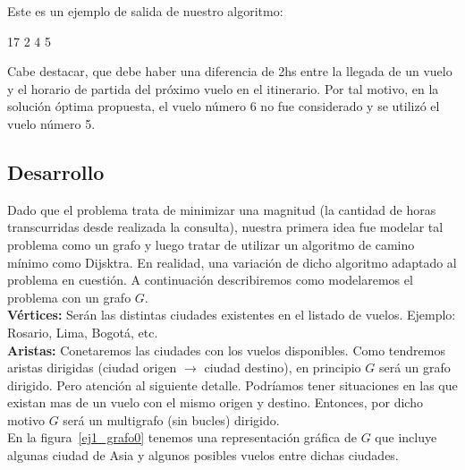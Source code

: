 Este es un ejemplo de salida de nuestro algoritmo:
\begin{codebox}
17 2 4 5
\end{codebox}

Cabe destacar, que debe haber una diferencia de 2hs entre la llegada de un vuelo y el horario de partida del próximo vuelo en el itinerario. Por tal motivo, en la solución óptima propuesta, el vuelo número 6 no fue considerado y se utilizó el vuelo número 5.

\newpage
\subsection{Desarrollo}

Dado que el problema trata de minimizar una magnitud (la cantidad de horas transcurridas desde realizada la consulta), nuestra primera idea fue 
modelar tal problema como un grafo y luego tratar de utilizar un algoritmo de camino mínimo como Dijsktra. En realidad, una variación de dicho
algoritmo adaptado al problema en cuestión. A continuación describiremos como modelaremos el problema con un grafo $G$.\\

\textbf{Vértices:} Serán las distintas ciudades existentes en el listado de vuelos. Ejemplo: Rosario, Lima, Bogotá, etc.\\
\indent
\textbf{Aristas:} Conetaremos las ciudades con los vuelos disponibles. Como tendremos aristas dirigidas (ciudad origen $\rightarrow$ ciudad destino), 
en principio $G$ será un grafo dirigido. 
Pero atención al siguiente detalle. Podríamos tener situaciones en las que existan mas de un vuelo con el mismo origen y destino. 
Entonces, por dicho motivo $G$ será un multigrafo (sin bucles) dirigido. \\

En la figura~\ref{ej1_grafo0} tenemos una representación gráfica de $G$ que incluye algunas ciudad de Asia y algunos posibles vuelos entre dichas ciudades.

